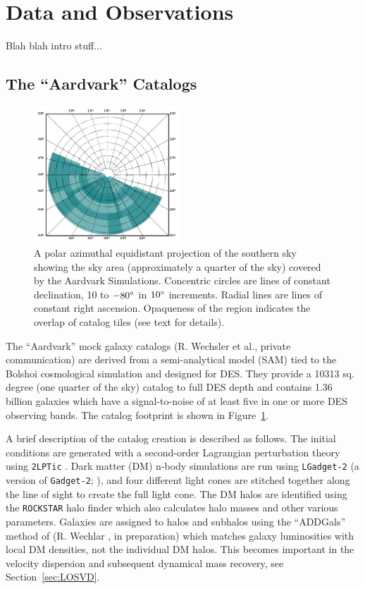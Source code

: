 \documentclass[apj, revtex4]{emulateapj}
\begin{document}
\section{Data and Observations}

Blah blah intro stuff... 

\subsection{The ``Aardvark'' Catalogs}
\begin{figure} 
	\includegraphics[width=0.49\textwidth]{surveyArea.pdf} 
	\caption{A polar azimuthal equidistant projection of the southern sky showing the sky area (approximately a quarter of the sky) covered by the Aardvark Simulations. Concentric circles are lines of constant declination, 10 to $-80\hbox{$^\circ$}$ in $10\hbox{$^\circ$}$ increments. Radial lines are lines of constant right ascension. Opaqueness of the region indicates the overlap of catalog tiles (see text for details).} 
	\label{fig:survey area} 
\end{figure}

The ``Aardvark'' mock galaxy catalogs (R. Wechsler et al., private communication) are derived from a semi-analytical model (SAM) tied to the Bolshoi cosmological simulation \citep{Klypin2011} and designed for DES. They provide a 10313 sq. degree (one quarter of the sky) catalog to full DES depth and contains 1.36 billion galaxies which have a signal-to-noise of at least five in one or more DES observing bands. The catalog footprint is shown in Figure~\ref{fig:survey area}.

A brief description of the catalog creation is described as follows. The initial conditions are generated with a second-order Lagrangian perturbation theory using {\tt2LPTic} \citep{Crocce2006}. Dark matter (DM) n-body simulations are run using {\tt LGadget-2} (a version of {\tt Gadget-2}; \citealt{Springel2005}), and four different light cones are stitched together along the line of sight to create the full light cone. The DM halos are identified using the {\tt ROCKSTAR} halo finder \citep{Behroozi2013} which also calculates halo masses and other various parameters. Galaxies are assigned to halos and subhalos using the ``ADDGals'' method of (R. Wechlar \etal, in preparation) which matches galaxy luminosities with local DM densities, not the individual DM halos. This becomes important in the velocity dispersion and subsequent dynamical mass recovery, see Section~\ref{sec:LOSVD}.
\end{document}
